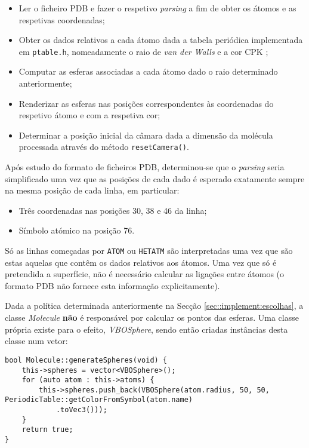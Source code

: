 \begin{itemize}
    \item Ler o ficheiro \ac{PDB} e fazer o respetivo \textit{parsing} a fim de obter os átomos e as respetivas coordenadas;
    
    \item Obter os dados relativos a cada átomo dada a tabela periódica implementada em \verb|ptable.h|, nomeadamente o raio de \textit{van der Walls} \cite{ptable} e a cor CPK \cite{cpk};
    
    \item Computar as esferas associadas a cada átomo dado o raio determinado anteriormente;
    
    \item Renderizar as esferas nas posições correspondentes às coordenadas do respetivo átomo e com a respetiva cor;
    
    \item Determinar a posição inicial da câmara dada a dimensão da molécula processada através do método \verb|resetCamera()|.
\end{itemize}

Após estudo do formato de ficheiros \ac{PDB}, determinou-se que o \textit{parsing} seria simplificado uma vez que as posições de cada dado é esperado exatamente sempre na mesma posição de cada linha, em particular:

\begin{itemize}
    \item Três coordenadas nas posições 30, 38 e 46 da linha;
    \item Símbolo atómico na posição 76.
\end{itemize}

Só as linhas começadas por \verb|ATOM| ou \verb|HETATM| são interpretadas uma vez que são estas aquelas que contêm os dados relativos aos átomos. Uma vez que só é pretendida a superfície, não é necessário calcular as ligações entre átomos (o formato \ac{PDB} não fornece esta informação explicitamente).

Dada a política determinada anteriormente na Secção \ref{sec::implement:escolhas}, a classe \textit{Molecule} \textbf{não} é responsável por calcular os pontos das esferas. Uma classe própria existe para o efeito, \textit{VBOSphere}, sendo então criadas instâncias desta classe num vetor:

\begin{verbatim}
bool Molecule::generateSpheres(void) {
    this->spheres = vector<VBOSphere>();
    for (auto atom : this->atoms) {
        this->spheres.push_back(VBOSphere(atom.radius, 50, 50, PeriodicTable::getColorFromSymbol(atom.name)
            .toVec3()));
    }
    return true;
}
\end{verbatim}

